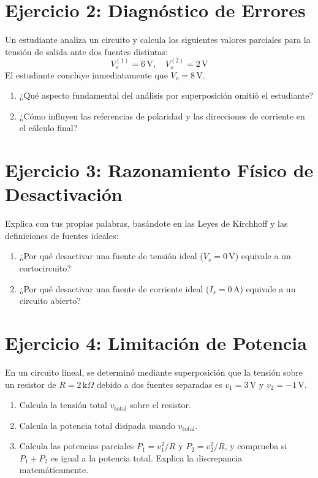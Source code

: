 \documentclass[11pt, a4paper]{article}
\begin{document}
\section*{Ejercicio 2: Diagnóstico de Errores}
Un estudiante analiza un circuito y calcula los siguientes valores parciales para la tensión de salida ante dos fuentes distintas:
\begin{equation*}
    V_o^{(1)} = 6\,\text{V}, \quad V_o^{(2)} = 2\,\text{V}
\end{equation*}
El estudiante concluye inmediatamente que $V_o = 8\,\text{V}$. 
\begin{enumerate}
    \item ¿Qué aspecto fundamental del análisis por superposición omitió el estudiante?
    \item ¿Cómo influyen las referencias de polaridad y las direcciones de corriente en el cálculo final?
\end{enumerate}

\section*{Ejercicio 3: Razonamiento Físico de Desactivación}
Explica con tus propias palabras, basándote en las Leyes de Kirchhoff y las definiciones de fuentes ideales:
\begin{enumerate}
    \item ¿Por qué desactivar una fuente de tensión ideal ($V_s = 0\,\text{V}$) equivale a un cortocircuito?
    \item ¿Por qué desactivar una fuente de corriente ideal ($I_s = 0\,\text{A}$) equivale a un circuito abierto?
\end{enumerate}

\section*{Ejercicio 4: Limitación de Potencia}
En un circuito lineal, se determinó mediante superposición que la tensión sobre un resistor de $R = 2\,\text{k}\Omega$ debido a dos fuentes separadas es $v_1 = 3\,\text{V}$ y $v_2 = -1\,\text{V}$.
\begin{enumerate}
    \item Calcula la tensión total $v_{\text{total}}$ sobre el resistor.
    \item Calcula la potencia total disipada usando $v_{\text{total}}$.
    \item Calcula las potencias parciales $P_1 = v_1^2/R$ y $P_2 = v_2^2/R$, y comprueba si $P_1 + P_2$ es igual a la potencia total. Explica la discrepancia matemáticamente.
\end{enumerate}
\end{document}
